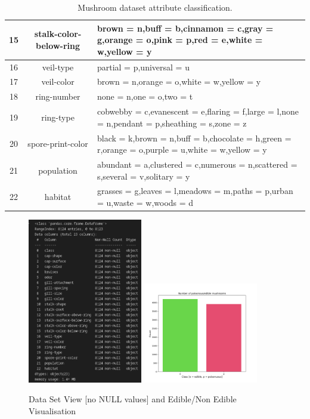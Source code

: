\documentclass[a4paper,11pt]{article}
\begin{document}
\begin{table}[h!]
\begin{center}
\begin{tabular} {|| c | c | p{8cm} ||}
                \hline
                15 & stalk-color-below-ring & brown = n,buff = b,cinnamon = c,gray = g,orange = o,pink = p,red = e,white = w,yellow = y \\
                \hline
                16 & veil-type & partial = p,universal = u \\
                \hline
                17 & veil-color & brown = n,orange = o,white = w,yellow = y \\
                \hline
                18 & ring-number & none = n,one = o,two = t \\
                \hline
                19 & ring-type & cobwebby = c,evanescent = e,flaring = f,large = l,none = n,pendant = p,sheathing = s,zone = z \\
                \hline
                20 & spore-print-color & black = k,brown = n,buff = b,chocolate = h,green = r,orange = o,purple = u,white = w,yellow = y \\
                \hline
                21 & population & abundant = a,clustered = c,numerous = n,scattered = s,several = v,solitary = y \\
                \hline
                22 & habitat & grasses = g,leaves = l,meadows = m,paths = p,urban = u,waste = w,woods = d \\
                \hline
            \end{tabular}
            \caption{Mushroom dataset attribute classification.}
            \end{center}
            \end{table}

            \begin{figure}[!h]
                \centering
                \includegraphics[width=5cm]{ipimages/info.png}
                \includegraphics[width=5cm]{opimages/mushrooms1.png}
                \caption{Data Set View [no NULL values] and Edible/Non Edible Visualisation}
            \end{figure}
\end{document}
